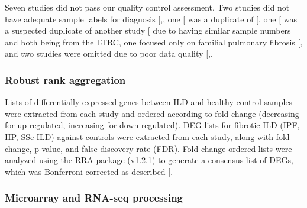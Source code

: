 \documentclass[
]{article}
\begin{document}
Seven studies did not pass our quality control assessment. Two studies did not have adequate sample labels for diagnosis {[},\citeproc{ref-zhu_integration_2018}{152}{]}, one {[}\citeproc{ref-christmann_association_2014}{126}{]} was a duplicate of {[}\citeproc{ref-christmann_mir-155_2016}{81}{]}, one {[}\citeproc{ref-ghosh_lung_2022}{153}{]} was a suspected duplicate of another study {[}\citeproc{ref-borie_colocalization_2022}{69}{]} due to having similar sample numbers and both being from the LTRC, one focused only on familial pulmonary fibrosis {[}\citeproc{ref-el-chemaly_immunome_2018}{154}{]}, and two studies were omitted due to poor data quality {[},\citeproc{ref-zhou_integrated_2019}{155}{]}.

\subsubsection{Robust rank aggregation}\label{robust-rank-aggregation}

Lists of differentially expressed genes between ILD and healthy control samples were extracted from each study and ordered according to fold-change (decreasing for up-regulated, increasing for down-regulated). DEG lists for fibrotic ILD (IPF, HP, SSc-ILD) against controls were extracted from each study, along with fold change, p-value, and false discovery rate (FDR). Fold change-ordered lists were analyzed using the RRA package (v1.2.1) to generate a consensus list of DEGs, which was Bonferroni-corrected as described {[}\citeproc{ref-vosa_comprehensive_2014}{156}{]}.

\subsubsection{Microarray and RNA-seq processing}\label{microarray-and-rna-seq-processing}
\end{document}
